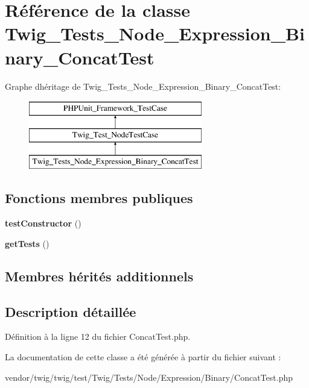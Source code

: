 \hypertarget{class_twig___tests___node___expression___binary___concat_test}{}\section{Référence de la classe Twig\+\_\+\+Tests\+\_\+\+Node\+\_\+\+Expression\+\_\+\+Binary\+\_\+\+Concat\+Test}
\label{class_twig___tests___node___expression___binary___concat_test}
Graphe d\textquotesingle{}héritage de Twig\+\_\+\+Tests\+\_\+\+Node\+\_\+\+Expression\+\_\+\+Binary\+\_\+\+Concat\+Test\+:\begin{figure}[H]
\begin{center}
\leavevmode
\includegraphics[height=3.000000cm]{class_twig___tests___node___expression___binary___concat_test}
\end{center}
\end{figure}
\subsection*{Fonctions membres publiques}
\begin{DoxyCompactItemize}
\item 
{\bfseries test\+Constructor} ()\hypertarget{class_twig___tests___node___expression___binary___concat_test_a47094dc941e72950570900d1418f89c6}{}\label{class_twig___tests___node___expression___binary___concat_test_a47094dc941e72950570900d1418f89c6}

\item 
{\bfseries get\+Tests} ()\hypertarget{class_twig___tests___node___expression___binary___concat_test_a7e247dd31cc8d37a6c97353a062a0080}{}\label{class_twig___tests___node___expression___binary___concat_test_a7e247dd31cc8d37a6c97353a062a0080}

\end{DoxyCompactItemize}
\subsection*{Membres hérités additionnels}


\subsection{Description détaillée}


Définition à la ligne 12 du fichier Concat\+Test.\+php.



La documentation de cette classe a été générée à partir du fichier suivant \+:\begin{DoxyCompactItemize}
\item 
vendor/twig/twig/test/\+Twig/\+Tests/\+Node/\+Expression/\+Binary/Concat\+Test.\+php\end{DoxyCompactItemize}
